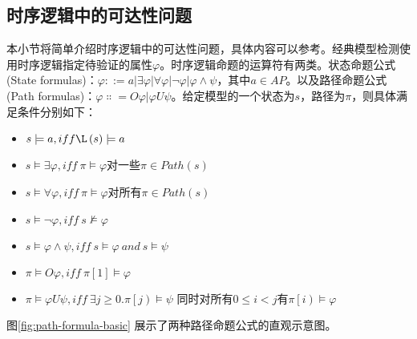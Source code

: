 \subsection{时序逻辑中的可达性问题}
本小节将简单介绍时序逻辑中的可达性问题，具体内容可以参考\citep{goranko_2023}。经典模型检测使用时序逻辑指定待验证的属性\(\varphi\)。时序逻辑命题的运算符有两类。状态命题公式(State formulas)：\(\varphi ::=a\left|\exists\varphi\right|\forall \varphi\left|\lnot\varphi\right|\varphi\land\psi\)，其中\(a\in AP\)。以及路径命题公式(Path formulas)：\(\varphi\Colon=O\varphi|\varphi U\psi\)。给定模型的一个状态为\(s\)，路径为\(\pi\)，则具体满足条件分别如下：
\begin{itemize}
    \item \(s\models a,iff \L\left(s\right)\models a\)
    \item \(s\models\exists\varphi,iff\ \pi\models\varphi\)对一些\(\pi\in Path\left(s\right)\)
    \item \(s\models\forall\varphi,iff\ \pi\models\varphi\)对所有\(π\in Path(s)\)
    \item \(s\models\lnot\varphi,iff\ s\nvDash\varphi\)
    \item \(s\models\varphi\land\psi,iff\ s\models\varphi\ and\ s\models\psi\)
    \item \(\pi\models O\varphi,iff\ \pi\left[1\right]\models\varphi\)
    \item \(\pi\models\varphi U\psi,iff\ \exists j\geq0\).\(\pi\left[j\right)\models\psi\) 同时对所有\(0\le i<j\)有\(\pi\left[i\right)\models\varphi\)
\end{itemize}


图\ref{fig:path-formula-basic} 展示了两种路径命题公式的直观示意图。


